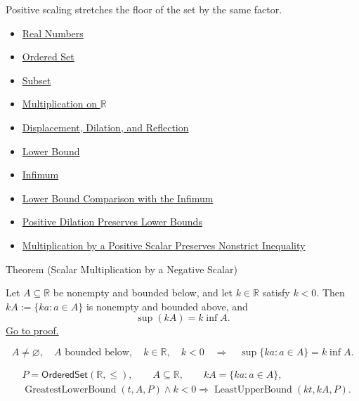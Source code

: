 \begin{remark*}[Interpretation]
Positive scaling stretches the floor of the set by the same factor.
\end{remark*}

\begin{dependencies}
\begin{itemize}
  \item \hyperref[def:reals]{Real Numbers}
  \item \hyperref[def:ordered-set]{Ordered Set}
  \item \hyperref[def:subset]{Subset}
  \item \hyperref[def:multiplication-on-r]{Multiplication on $\mathbb{R}$}
  \item \hyperref[def:displacement-dilation-reflection]{Displacement, Dilation, and Reflection}
  \item \hyperref[def:real-lower-bound]{Lower Bound}
  \item \hyperref[def:infimum]{Infimum}
  \item \hyperref[prop:lower-bound-comparison-with-the-infimum]{Lower Bound Comparison with the Infimum}
  \item \hyperref[prop:positive-dilation-preserves-lower-bounds]{Positive Dilation Preserves Lower Bounds}
  \item \hyperref[thm:ineq-nonstrict-multiply-positive]{Multiplication by a Positive Scalar Preserves Nonstrict Inequality}
\end{itemize}
\end{dependencies}


\begin{theorembox}{Theorem (Scalar Multiplication by a Negative Scalar)}
\begin{theorem}
\label{thm:scalar-mult-negative}
Let $A\subseteq\mathbb{R}$ be nonempty and bounded below, and let
$k\in\mathbb{R}$ satisfy $k<0$.  Then $kA:=\{ka:a\in A\}$ is nonempty and
bounded above, and
\[
  \sup(kA)=k\inf A.
\]
\hyperref[prf:scalar-mult-negative]{Go to proof.}
\end{theorem}
\end{theorembox}

\begin{remark*}
\[
A\neq\varnothing,\quad A\text{ bounded below},\quad k\in\mathbb{R},\quad k<0
\quad\Longrightarrow\quad
\sup\{ka:a\in A\}=k\inf A.
\]
\end{remark*}

\begin{remark*}
\[
\begin{aligned}
&P=\mathsf{OrderedSet}(\mathbb{R},\leq),\qquad A\subseteq\mathbb{R},\qquad kA=\{ka:a\in A\},\\
&\operatorname{GreatestLowerBound}(t,A,P)\land k<0
\Longrightarrow
\operatorname{LeastUpperBound}(kt,kA,P).
\end{aligned}
\]
\end{remark*}

